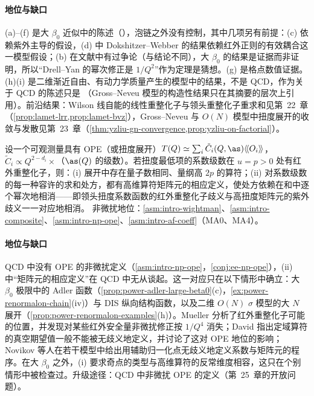 \paragraph{地位与缺口}
(a)--(f) 是大 $\beta_0$ 近似中的陈述（\tagP），泡链之外没有控制，其中几项另有前提：(c) 依赖紫外主导的假设，(d) 中 Dokshitzer--Webber 的结果依赖红外正则的有效耦合这一模型假设；(b) 在文献中有过争论（\cite{Korchemsky:1994is}与\cite{BenekeBraun1995b}结论不同），大 $\beta_0$ 的结果是证据而非证明，所以“Drell--Yan 的幂次修正是 $1/Q^2$”作为定理是猜想。(g) 是格点数值证据。(h)(i) 是二维渐近自由、有动力学质量产生的模型中的结果，不是 QCD，作为关于 QCD 的陈述只是 \tagP（Gross--Neveu 模型的构造性结果只在其摘要的层次上引用）。前沿结果：Wilson 线自能的线性重整化子与领头重整化子重求和见第~22~章（\cref{prop:lamet-lrr,prop:lamet-bvz}），Gross--Neveu 与 $O(N)$ 模型中扭度展开的收敛与发散见第~23~章（\cref{thm:yzliu-gn-convergence,prop:yzliu-on-factorial}）。

\begin{conjecture}\label{conj:power-renormalon-ht}
设一个可观测量具有 OPE（或扭度展开）$T(Q)\simeq\sum_i\tilde C_i(Q,\as)\langle\!\langle O_i\rangle\!\rangle$，$\tilde C_i\propto Q^{2-d_i}\times$（$\as(Q)$ 的级数）。若扭度最低项的系数级数在 $u=p>0$ 处有红外重整化子，则：(i) 展开中存在量子数相同、量纲高 $2p$ 的算符；(ii) 对系数级数的每一种容许的求和处方，都有高维算符矩阵元的相应定义，使处方依赖在和中逐个幂次地相消——即领头扭度系数函数的红外重整化子歧义与高扭度矩阵元的紫外歧义一一对应地相消\cite{Mueller1985,David:1983gz,David:1985xj,Novikov:1984rf,tHooft1979}。
非微扰地位：\cref{asm:intro-wightman}、\cref{asm:intro-composite}、\cref{asm:intro-np-ope}、\cref{asm:intro-af-coeff}（MA0、MA4）。
\end{conjecture}

\paragraph{地位与缺口}
QCD 中没有 OPE 的非微扰定义（\cref{asm:intro-np-ope}，\cref{conj:ee-np-ope}），(ii) 中“矩阵元的相应定义”在 QCD 中无从谈起。这一对应只在以下情形中确立：大 $\beta_0$ 极限中的 Adler 函数（\cref{prop:power-adler-large-beta0}(c)，\cref{ex:power-renormalon-chain}(iv)）与 DIS 纵向结构函数\cite[第~4.2.2~节]{Beneke1999}，以及二维 $O(N)$ $\sigma$ 模型的大 $N$ 展开（\cref{prop:power-renormalon-examples}(h)）。Mueller 分析了红外重整化子可能的位置，并发现对某些红外安全量非微扰修正按 $1/Q^4$ 消失\cite{Mueller1985}；David 指出定域算符的真空期望值一般不能被无歧义地定义，并讨论了这对 OPE 地位的影响\cite{David:1983gz,David:1985xj}；Novikov 等人在若干模型中给出用辅助归一化点无歧义地定义系数与矩阵元的程序\cite{Novikov:1984rf}。在大 $\beta_0$ 之外，(i) 要求奇点的类型与高维算符的反常维度相容，这只在个别情形中被检查过\cite[第~5.2.1~节]{Beneke1999}。升级途径：QCD 中非微扰 OPE 的定义（第~25~章的开放问题）。

